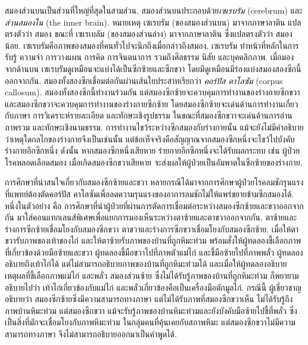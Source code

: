 {\begin{shaded}
		สมองส่วนบนเป็นส่วนที่ใหญ่ที่สุดในสามส่วน.
		สมองส่วนบนประกอบด้วย\textit{เซเรบรัม} (cerebrum) และ\textit{ส่วนสมองใน} (the inner brain).
		หมายเหตุ เซเรบรัม (ของสมองส่วนบน) มาจากภาษาลาติน แปลตรงตัวว่า สมอง
		ขณะที่ เซเรเบลัม (ของสมองส่วนล่าง) มาจากภาษาลาติน ซึ่งแปลตรงตัวว่า สมองน้อย.
		เซเรบรัมคือภาพของสมองที่คนทั่วไปจะนึกถึงเมื่อกล่าวถึงสมอง.
		เซเรบรัม ทำหน้าที่หลักในการรับรู้ ความจำ การวางแผน การคิด การจินตนาการ รวมถึงศีลธรรม นิสัย และบุคคลิกภาพ.
		เมื่อมองจากด้านบน เซเรบรัมดูเหมือนจะแบ่งได้เป็นซีกซ้ายและซีกขวา โดยมีดูเหมือนมีร่องแบ่งสมองสองซีกนี้ออกจากกัน.
		สมองทั้งสองซีกเชื่อมต่อกันผ่านเส้นใยประสาทเรียกว่า \textit{คอร์ปัส คาโลซัม} (corpus callosum).
		สมองทั้งสองซีกนี้ทำงานร่วมกัน แต่สมองซีกซ้ายจะควบคุมการทำงานของร่างกายซีกขวา และสมองซีกขวาจะควบคุมการทำงานของร่างกายซีกซ้าย
		โดยสมองซีกซ้ายจะเด่นด้านการทำงานเกี่ยวกับภาษา การวิเคราะห์รายละเอียด และทักษะเชิงรูปธรรม
		ในขณะที่สมองซีกขวาจะเด่นด้านการอ่านภาพรวม และทักษะเชิงนามธรรม.
		การทำงานไขว้ระหว่างซีกสมองกับร่างกายนั้น แม้จะยังไม่มีคำอธิบายว่าเหตุใดกลไกของร่างกายจึงเป็นเช่นนั้น
		แต่ข้อเท็จจริงคือสัญญาณจากสมองซีกหนึ่งจะไขว้ไปบังคับร่างกายอีกซีกหนึ่ง
		ดังนั้น หากสมองซีกหนึ่งเสียหาย ร่ายกายอีกซีกหนึ่งจะได้รับผลกระทบ
		เช่น 
		ผู้ป่วยโรคหลอดเลือดสมอง เมื่อเกิดสมองซีกขวาเสียหาย จะส่งผลให้ผู้ป่วยเป็นอัมพาตในซีกซ้ายของร่างกาย.
		
		การศึกษาที่น่าสนใจเกี่ยวกับสมองซีกซ้ายและขวา หลายกรณีได้มาจากการศึกษาผู้ป่วยโรคลมชักรุนแรง ที่แพทย์ต้องตัดคอร์ปัส คาโลซัมเพื่อลดความรุนแรงของอาการลมชักไม่ให้แพร่ขยายข้ามซีกสมองได้.
		หนึ่งในตัวอย่าง\cite{Vinogradov2007a}
		คือ การศึกษาที่นำผู้ป่วยที่ผ่านการตัดการเชื่อมต่อระหว่างสมองซีกซ้ายและขวาออกจากกัน มาใส่คอนแทกเลนส์พิเศษเพื่อแยกการมองเห็นระหว่างตาซ้ายและตาขวาออกจากกัน.
		ตาซ้ายและร่างการซีกซ้ายเชื่อมโยงกับสมองซีกขวา
		ตาขวาและร่างการซีกขวาเชื่อมโยงกับสมองซีกซ้าย.
		เมื่อให้ตาขวารับภาพของเท้าของไก่
		และให้ตาซ้ายรับภาพของบ้านที่ถูกหิมะท่วม
		พร้อมสั่งให้ผู้ทดลองชี้เลือกภาพที่เกี่ยวข้องด้วยมือซ้ายและขวา
		ผู้ทดลองชี้มือขวาไปที่ภาพตัวแม่ไก่
		และชี้มือซ้ายไปที่ภาพพลั่ว
		ผู้ทดลอง อธิบายถึงเท้าไก่ได้ แต่ไม่สามารถอธิบายภาพของบ้านที่ถูกหิมะท่วมได้
		และเมื่อให้ผู้ทดลองอธิบายเหตุผลที่ชี้เลือกภาพแม่ไก่ และพลั่ว
		สมองส่วนซ้าย ซึ่งไม่ได้รับรู้ภาพของบ้านที่ถูกหิมะท่วม ก็พยายามอธิบายไปว่า เท้าไก่เกี่ยวข้องกับแม่ไก่ 
		และพลั่วเกี่ยวข้องคือเป็นเครื่องมือตักมูลไก่.
		กรณีนี้ ผู้เชี่ยวชาญอธิบายว่า สมองซีกซ้ายซึ่งมีความสามารถทางภาษา แต่ไม่ได้รับภาพที่สมองซีกขวาเห็น ไม่ได้รับรู้ถึงภาพบ้านหิมะท่วม
		แต่สมองซีกขวา แม้จะรับรู้ภาพของบ้านหิมะท่วมและยังบังคับมือซ้ายไปชี้ที่พลั่ว 
		ซึ่งเป็นสิ่งที่มักจะเชื่อมโยงกับภาพหิมะท่วม ในกลุ่มคนที่คุ้นเคยกับสภาพหิมะ 
		แต่สมองซีกขวาไม่มีความสามารถทางภาษา จึงไม่สามารถอธิบายออกมาเป็นคำพูดได้.
		

\end{shaded}}

